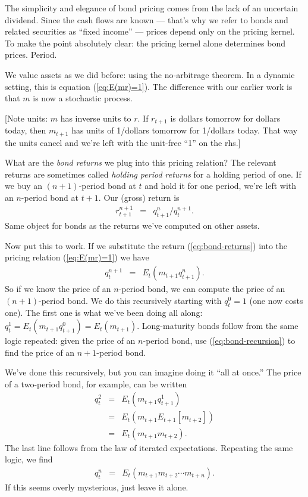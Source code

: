 \documentclass[11pt]{article}
\begin{document}
The simplicity and elegance of bond pricing comes
from the lack of an uncertain dividend.
Since the cash flows are known ---
that's why we refer to bonds and related securities as ``fixed income'' ---
prices depend only on the pricing kernel.
To make the point absolutely clear:  the pricing kernel alone determines
bond prices.  Period.


We value assets as we did before:  using the no-arbitrage theorem.
In a dynamic setting, this is equation (\ref{eq:E(mr)=1}).
The difference with our earlier work is that $m$ is now a stochastic process.

[Note units:  $m$ has inverse units to $r$.
If $r_{t+1}$ is dollars tomorrow for dollars today,
then $m_{t+1}$ has units of 1/dollars tomorrow
for 1/dollars today.
That way the units cancel and we're left with the unit-free ``1'' on the rhs.]

What are the {\it bond returns\/} we plug into this pricing relation?
The relevant returns are sometimes called {\it holding period returns\/}
for a holding period of one.
If we buy an $(n+1)$-period bond at $t$ and hold it for one period,
we're left with an $n$-period bond at $t+1$.
Our (gross) return is
\begin{eqnarray}
        r^{n+1}_{t+1} &=&  q^n_{t+1}/q^{n+1}_t .
        \label{eq:bond-returns}
\end{eqnarray}
Same object for bonds as the returns we've computed on
other assets.


Now put this to work.  If we substitute the return (\ref{eq:bond-returns})
into the pricing relation (\ref{eq:E(mr)=1}) we have
\begin{eqnarray}
    q^{n+1}_t &=& E_t \left( m_{t+1} q^n_{t+1} \right) .
    \label{eq:bond-recursion}
\end{eqnarray}
So if we know the price of an $n$-period bond,
we can compute the price of an $(n+1)$-period bond.
We do this recursively starting with $q^0_t = 1$ (one now costs one).
The first one is what we've been doing all along:
$ q^1_t = E_t (m_{t+1} q^0_{t+1}) = E_t (m_{t+1})$.
Long-maturity bonds follow from the same logic repeated:
given the price of an $n$-period bond,
use (\ref{eq:bond-recursion}) to find the price of an $n+1$-period bond.

We've done this recursively, but you can imagine doing it ``all at once.''
The price of a two-period bond, for example, can be written
\begin{eqnarray*}
    q^{2}_t &=& E_t \left( m_{t+1} q^1_{t+1} \right) \\
            &=& E_t \left( m_{t+1} E_{t+1} [m_{t+2}] \right) \\
            &=& E_t \left( m_{t+1} m_{t+2} \right) .
\end{eqnarray*}
The last line follows from the law of iterated expectations.
Repeating the same logic, we find
\begin{eqnarray*}
    q^{n}_t  &=& E_t \left( m_{t+1} m_{t+2} \cdots m_{t+n} \right) .
\end{eqnarray*}
If this seems overly mysterious, just leave it alone.
\end{document}
